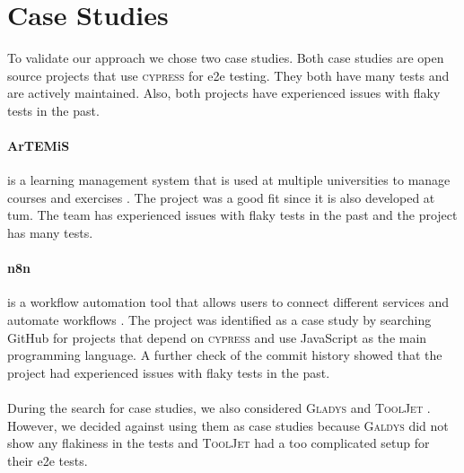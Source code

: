 \section{Case Studies}
To validate our approach we chose two case studies.
Both case studies are open source projects that use \textsc{cypress} for \ac{e2e} testing.
They both have many tests and are actively maintained.
Also, both projects have experienced issues with flaky tests in the past.

\paragraph{ArTEMiS} is a learning management system that is used at multiple universities to manage courses and exercises \autocite{krusche_artemis_2018}.
The project was a good fit since it is also developed at \ac{tum}.
The team has experienced issues with flaky tests in the past and the project has many tests.

\paragraph{n8n} is a workflow automation tool that allows users to connect different services and automate workflows \autocite{noauthor_n8n_2023}. The project was identified as a case study by searching GitHub for projects that depend on \textsc{cypress} and use JavaScript as the main programming language. A further check of the commit history showed that the project had experienced issues with flaky tests in the past.

\paragraph{} During the search for case studies, we also considered \textsc{Gladys} \autocite{noauthor_gladys_2023} and \textsc{ToolJet} \autocite{noauthor_tooljettooljet_2023}. However, we decided against using them as case studies because \textsc{Galdys} did not show any flakiness in the tests and \textsc{ToolJet} had a too complicated setup for their \ac{e2e} tests.

